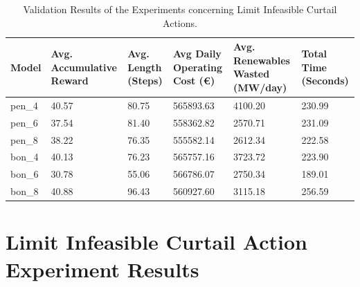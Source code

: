 \begin{table}[ht]
	\centering
	\begin{tabularx}{\textwidth}{|l|X|X|X|X|X|}
		\hline
		\textbf{Model} & \textbf{Avg. Accumulative Reward}& \textbf{Avg. Length (Steps)} & \textbf{Avg Daily Operating Cost (€)} & \textbf{Avg. Renewables Wasted (MW/day)} & \textbf{Total Time (Seconds)}\\
		\hline
		pen\_4 & 40.57 & 80.75 & 565893.63 & 4100.20 & 230.99 \\
		pen\_6 & 37.54 & 81.40 & 558362.82 & 2570.71 & 231.09 \\
		pen\_8 & 38.22 & 76.35 & 555582.14 & 2612.34 & 222.58 \\
		bon\_4 & 40.13 & 76.23 & 565757.16 & 3723.72 & 223.90 \\
		bon\_6 & 30.78 & 55.06 & 566786.07 & 2750.34 & 189.01 \\
		bon\_8 & 40.88 & 96.43 & 560927.60 & 3115.18 & 256.59 \\
		\hline
	\end{tabularx}
	\caption{Validation Results of the Experiments concerning Limit Infeasible Curtail Actions.}
	\label{fig:curtail-val}
\end{table}


\section{Limit Infeasible Curtail Action Experiment Results}

